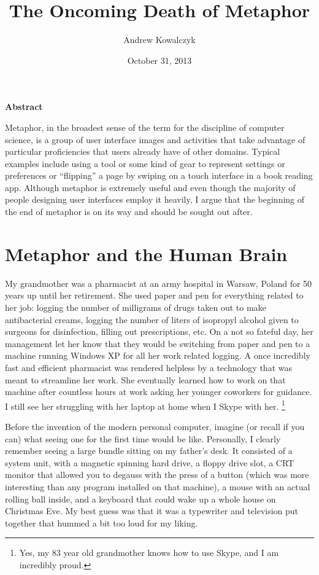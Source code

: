 \documentclass[11pt, oneside]{article}
\title{The Oncoming Death of Metaphor}
\author{Andrew Kowalczyk}
\date{October 31, 2013}
\begin{document}
\maketitle
\centerline{\textbf{Abstract}}
Metaphor, in the broadest sense of the term for the discipline of computer science, is a group of user interface images and activities that take advantage of particular proficiencies that users already have of other domains. Typical examples include using a tool or some kind of gear to represent settings or preferences or ``flipping'' a page by swiping on a touch interface in a book reading app. Although metaphor is extremely useful and even though the majority of people designing user interfaces employ it heavily, I argue that the beginning of the end of metaphor is on its way and should be sought out after.

\pagebreak
\section{Metaphor and the Human Brain} 

My grandmother was a pharmacist at an army hospital in Warsaw, Poland for 50 years up until her retirement. She used paper and pen for everything related to her job: logging the number of milligrams of drugs taken out to make antibacterial creams, logging the number of liters of isopropyl alcohol given to surgeons for disinfection, filling out prescriptions, etc. On a not so fateful day, her management let her know that they would be switching from paper and pen to a machine running Windows XP for all her work related logging. A once incredibly fast and efficient pharmacist was rendered helpless by a technology that was meant to streamline her work. She eventually learned how to work on that machine after countless hours at work asking her younger coworkers for guidance. I still see her struggling with her laptop at home when I Skype with her. \footnote{Yes, my 83 year old grandmother knows how to use Skype, and I am incredibly proud.}

Before the invention of the modern personal computer, imagine (or recall if you can) what seeing one for the first time would be like.
Personally, I clearly remember seeing a large bundle sitting on my father's desk. It consisted of a system unit, with a magnetic spinning hard drive, a floppy drive slot, a CRT monitor that allowed you to degauss with the press of a button (which was more interesting than any program installed on that machine), a mouse with an actual rolling ball inside, and a keyboard that could wake up a whole house on Christmas Eve. My best guess was that it was a typewriter and television put together that hummed a bit too loud for my liking.
\end{document}
